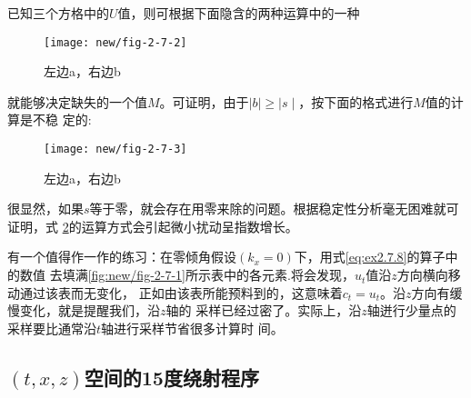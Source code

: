 已知三个方格中的$U$值，则可根据下面隐含的两种运算中的一种
\begin{figure}[H]
\centering
\texttt{[image: new/fig-2-7-2]}
\caption{左边a，右边b}
\label{fig:new/fig-2-7-2}
\end{figure}

就能够决定缺失的一个值$M$。可证明，由于$\mid b \mid \geq \mid s \mid $，按下面的格式进行$M$值的计算是不稳
定的:
\begin{figure}[H]
\centering
\texttt{[image: new/fig-2-7-3]}
\caption{左边a，右边b}
\label{fig:new/fig-2-7-3}
\end{figure}
很显然，如果$s$等于零，就会存在用零来除的问题。根据稳定性分析毫无困难就可证明，式
\ref{fig:new/fig-2-7-3}的运算方式会引起微小扰动呈指数增长。

有一个值得作一作的练习：在零倾角假设$(k_x=0)$下，用式\ref{eq:ex2.7.8}的算子中的数值
去填满\ref{fig:new/fig-2-7-1}所示表中的各元素.将会发现，$u_t$值沿$z$方向横向移动通过该表而无变化，
正如由该表所能预料到的，这意味着$c_t=u_t$。沿$z$方向有缓慢变化，就是提醒我们，沿$z$轴的
采样已经过密了。实际上，沿$z$轴迸行少量点的采样要比通常沿$t$轴进行采样节省很多计算时
间。

\subsection{$(t,x,z)$空间的15度绕射程序}
\label{sec:2.7.2}

